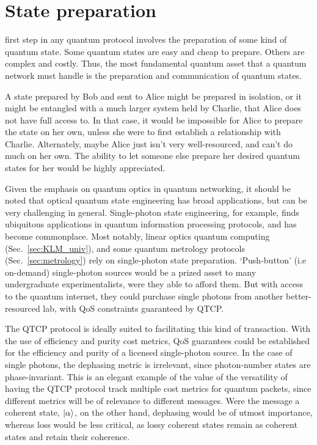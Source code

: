 \section{State preparation} 

 first step in any quantum protocol involves the preparation of some kind of quantum state. Some quantum states are easy and cheap to prepare. Others are complex and costly. Thus, the most fundamental quantum asset that a quantum network must handle is the preparation and communication of quantum states.

A state prepared by Bob and sent to Alice might be prepared in isolation, or it might be entangled with a much larger system held by Charlie, that Alice does not have full access to. In that case, it would be impossible for Alice to prepare the state on her own, unless she were to first establish a relationship with Charlie. Alternately, maybe Alice just isn't very well-resourced, and can't do much on her own. The ability to let someone else prepare her desired quantum states for her would be highly appreciated.

Given the emphasis on quantum optics in quantum networking, it should be noted that optical quantum state engineering has broad applications, but can be very challenging in general. Single-photon state engineering, for example, finds ubiquitous applications in quantum information processing protocols, and has become commonplace. Most notably, linear optics quantum computing (Sec.~\ref{sec:KLM_univ}), and some quantum metrology protocols (Sec.~\ref{sec:metrology}) rely on single-photon state preparation. `Push-button' (i.e on-demand) single-photon sources would be a prized asset to many undergraduate experimentalists, were they able to afford them. But with access to the quantum internet, they could purchase single photons from another better-resourced lab, with QoS constraints guaranteed by QTCP.

The QTCP protocol is ideally suited to facilitating this kind of transaction. With the use of efficiency and purity cost metrics, QoS guarantees could be established for the efficiency and purity of a licensed single-photon source. In the case of single photons, the dephasing metric is irrelevant, since photon-number states are phase-invariant. This is an elegant example of the value of the versatility of having the QTCP protocol track multiple cost metrics for quantum packets, since different metrics will be of relevance to different messages. Were the message a coherent state, $|\alpha\rangle$, on the other hand, dephasing would be of utmost importance, whereas loss would be less critical, as lossy coherent states remain as coherent states and retain their coherence.

